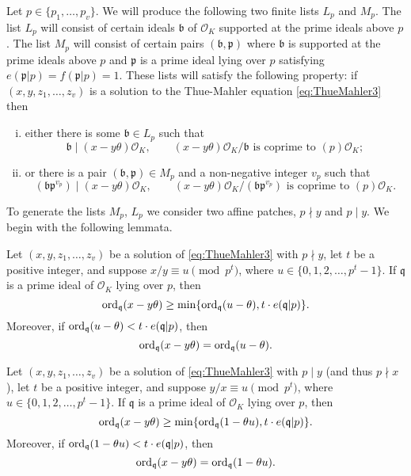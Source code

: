 Let $p \in \{p_1, \dots, p_v\}$. We will produce the following two finite lists $L_p$ and $M_p$. The list $L_p$ will
consist of certain ideals $\mathfrak{b}$ of $\mathcal{O}_K$ supported at the prime ideals above $p$. The list $M_p$ will consist of certain pairs $(\mathfrak{b},\mathfrak{p})$ where $\mathfrak{b}$ is supported at the prime ideals above $p$ and $\mathfrak{p}$ is a prime ideal lying over $p$ satisfying $e(\mathfrak{p}|p)=f(\mathfrak{p}|p)=1$. These lists will satisfy the following property: if $(x,y,z_1,\dots,z_v)$ is a solution to the Thue-Mahler equation \eqref{eq:ThueMahler3} then
\begin{enumerate}[(i)]
\item either there is some $\mathfrak{b} \in L_p$
such that
\begin{equation} \label{eq:Lp}
\mathfrak{b} \mid (x-y\theta )\mathcal{O}_K, \qquad \text{$(x-y\theta)\mathcal{O}_K/\mathfrak{b}$ is coprime to $(p)\mathcal{O}_K$};
\end{equation}
\item or there is a pair $(\mathfrak{b},\mathfrak{p}) \in M_p$ and a non-negative integer $v_p$ such that
\begin{equation} \label{eq:Mp}
(\mathfrak{b} \mathfrak{p}^{v_p}) \mid (x-y\theta)\mathcal{O}_K, \qquad \text{$(x-y\theta)\mathcal{O}_K/(\mathfrak{b} \mathfrak{p}^{v_p})$ is coprime to $(p)\mathcal{O}_K$}.
\end{equation}
\end{enumerate}

To generate the lists $M_p$, $L_p$ we consider two affine patches, $p \nmid y$ and $p \mid y$. We begin with the following lemmata.

\begin{lemma} \label{lem:AffinePatch1}\edit{[Siksek]}
Let $(x,y,z_1, \dots, z_v)$ be a solution of \eqref{eq:ThueMahler3} with $p \nmid y$, let $t$ be a positive integer, and suppose $x/y \equiv u \pmod{p^t}$, where ${u \in \{0,1,2,\dotsc,p^{t}-1\}}$. If $\mathfrak{q}$ is a prime ideal of $\mathcal{O}_K$ lying over $p$, then
\[\operatorname{ord}_{\mathfrak{q}}(x-y\theta)\ge \min\{\operatorname{ord}_{\mathfrak{q}}(u-\theta), t \cdot e(\mathfrak{q}|p)\}.\]
Moreover, if $\operatorname{ord}_{\mathfrak{q}}(u-\theta) < t \cdot e(\mathfrak{q}|p)$, then
\[\operatorname{ord}_\mathfrak{q}(x-y\theta) = \operatorname{ord}_{\mathfrak{q}}(u-\theta).\]
\end{lemma}

\begin{lemma} \label{lem:AffinePatch2} \edit{[Siksek]}
Let $(x,y,z_1, \dots, z_v)$ be a solution of \eqref{eq:ThueMahler3} with $p \mid y$ (and thus $p \nmid x$), let $t$ be a positive integer, and suppose $y/x \equiv u \pmod{p^t}$, where $u \in \{0,1,2,\dotsc,p^{t}-1\}$. If $\mathfrak{q}$ is a prime ideal of $\mathcal{O}_K$ lying over $p$, then
\[\operatorname{ord}_{\mathfrak{q}}(x-y\theta)\ge \min\{\operatorname{ord}_{\mathfrak{q}}(1-\theta u), t \cdot e(\mathfrak{q}|p)\}.\]
Moreover, if $\operatorname{ord}_{\mathfrak{q}}(1-\theta u) < t \cdot e(\mathfrak{q}|p)$, then
\[\operatorname{ord}_\mathfrak{q}(x-y\theta) = \operatorname{ord}_{\mathfrak{q}}(1 - \theta u).\]
\end{lemma}

